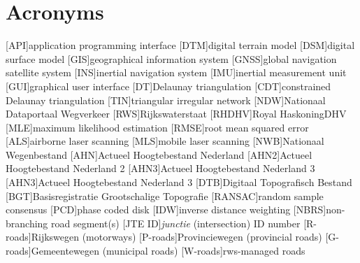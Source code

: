 \chapter*{Acronyms}

\begin{acronym}[UML]
  [API]{application programming interface}
  [DTM]{digital terrain model}
  [DSM]{digital surface model}
  [GIS]{geographical information system}
  [GNSS]{global navigation satellite system}
  [INS]{inertial navigation system}
  [IMU]{inertial measurement unit}
  [GUI]{graphical user interface}
  [DT]{Delaunay triangulation}
  [CDT]{constrained Delaunay triangulation}
  [TIN]{triangular irregular network}
  [NDW]{Nationaal Dataportaal Wegverkeer}
  [RWS]{Rijkswaterstaat}
  [RHDHV]{Royal HaskoningDHV}
  [MLE]{maximum likelihood estimation}
  [RMSE]{root mean squared error}
  [ALS]{airborne laser scanning}
  [MLS]{mobile laser scanning}
  [NWB]{Nationaal Wegenbestand}
  [AHN]{Actueel Hoogtebestand Nederland}
  [AHN2]{Actueel Hoogtebestand Nederland 2}
  [AHN3]{Actueel Hoogtebestand Nederland 3}
  [AHN3]{Actueel Hoogtebestand Nederland 3}
  [DTB]{Digitaal Topografisch Bestand}
  [BGT]{Basisregistratie Grootschalige Topografie}
  [RANSAC]{random sample consensus}
  [PCD]{phase coded disk}
  [IDW]{inverse distance weighting}
  [NBRS]{non-branching road segment(s)}
  [JTE ID]{\textit{junctie} (intersection) ID number}
  [R-roads]{Rijkswegen (motorways)}
  [P-roads]{Provinciewegen (provincial roads)}
  [G-roads]{Gemeentewegen (municipal roads)}
  [W-roads]{\ac{rws}-managed roads}
\end{acronym}